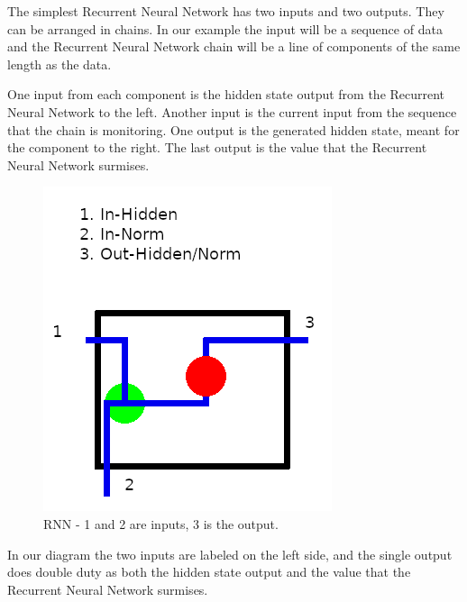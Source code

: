 The simplest Recurrent Neural Network has two inputs and two outputs. They can be arranged in chains. In our example the input will be a sequence of data and the Recurrent Neural Network chain will be a line of components of the same length as the data.

One input from each component is the hidden state output from the Recurrent Neural Network to the left. Another input is the current input from the sequence that the chain is monitoring. One output is the generated hidden state, meant for the component to the right. The last output is the value that the Recurrent Neural Network surmises. 

\begin{figure}[H]
	\begin{center}
	
	\includegraphics[scale=0.5]{diagram-rnn}
		
\end{center}
	\caption[Recurrent Neural Network]{RNN - 1 and 2 are inputs, 3 is the output.}
	
\end{figure}

In our diagram the two inputs are labeled on the left side, and the single output does double duty as both the hidden state output and the value that the Recurrent Neural Network surmises.

